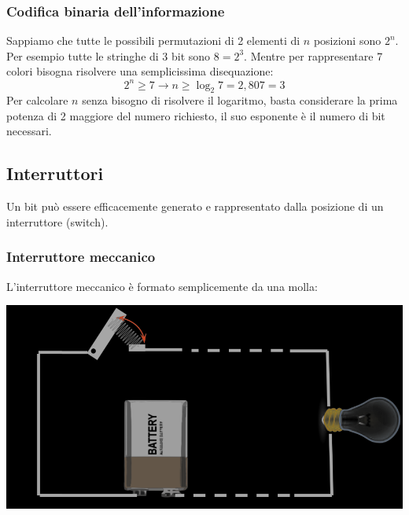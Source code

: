 \documentclass{article}
\begin{document}
\subsubsection{Codifica binaria dell'informazione}
Sappiamo che tutte le possibili permutazioni di 2 elementi di $n$ posizioni sono $2^n$.\\
Per esempio tutte le stringhe di 3 bit sono $8 = 2^3$. Mentre per rappresentare 7 colori bisogna risolvere una semplicissima disequazione:
$$ 2^n \geq 7 \rightarrow n \geq \log_2 7 = 2,807 = 3 $$
Per calcolare $n$ senza bisogno di risolvere il logaritmo, basta considerare la prima potenza di 2 maggiore del numero richiesto, il suo esponente è il numero di bit necessari.
\subsection{Interruttori}
Un bit può essere efficacemente generato e rappresentato dalla posizione di un interruttore (switch).
\subsubsection{Interruttore meccanico}
L'interruttore meccanico è formato semplicemente da una molla:
\begin{center}
    \includegraphics[scale=0.35]{intmecc.png}
\end{center}
\end{document}
